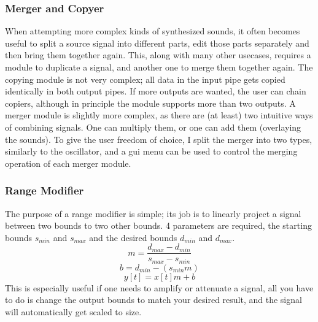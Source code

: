 \documentclass[11pt,a4paper]{article}
\begin{document}
\subsubsection{Merger and Copyer}

When attempting more complex kinds of synthesized sounds, it often becomes useful to split a source signal into different parts, edit those parts separately and then bring them together again. This, along with many other usecases, requires a module to duplicate a signal, and another one to merge them together again. The copying module is not very complex; all data in the input pipe gets copied identically in both output pipes. If more outputs are wanted, the user can chain copiers, although in principle the module supports more than two outputs.
A merger module is slightly more complex, as there are (at least) two intuitive ways of combining signals. One can multiply them, or one can add them (overlaying the sounds). To give the user freedom of choice, I split the merger into two types, similarly to the oscillator, and a gui menu can be used to control the merging operation of each merger module.

\subsubsection{Range Modifier}

The purpose of a range modifier is simple; its job is to linearly project a signal between two bounds to two other bounds. 4 parameters are required, the starting bounds $s_{min}$ and $s_{max}$ and the desired bounds $d_{min}$ and $d_{max}$.
\begin{equation}
m = \frac{d_{max} - d_{min}}{s_{max} - s_{min}}
\end{equation}
\begin{equation}
b = d_{min} - (s_{min}m)
\end{equation}
\begin{equation}
y[t] = x[t]m + b
\end{equation}
This is especially useful if one needs to amplify or attenuate a signal, all you have to do is change the output bounds to match your desired result, and the signal will automatically get scaled to size.
\end{document}
